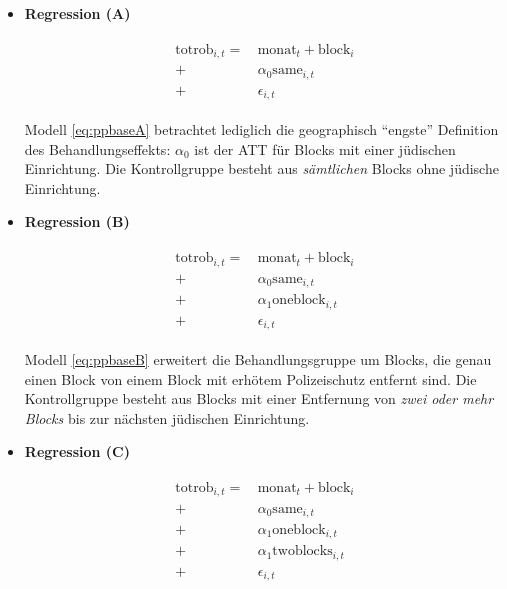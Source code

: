 \documentclass[
  a4paper,
  DIV=11,
  oneside]{scrreprt}
\begin{document}
\begin{itemize}
\item
  \textbf{Regression (A)}

  \begin{align}
      \begin{split}
        \text{totrob}_{i,t} 
          =&\, \text{monat}_t + \text{block}_i \\
         + &\, \alpha_0 \text{same}_{i,t} \\
         + &\, \epsilon_{i,t}
      \end{split}\label{eq:ppbaseA}
  \end{align}

  Modell \eqref{eq:ppbaseA} betrachtet lediglich die geographisch
  ``engste'' Definition des Behandlungseffekts: \(\alpha_0\) ist der ATT
  für Blocks mit einer jüdischen Einrichtung. Die Kontrollgruppe besteht
  aus \emph{sämtlichen} Blocks ohne jüdische Einrichtung.
\item
  \textbf{Regression (B)}

  \begin{align}
      \begin{split}
        \text{totrob}_{i,t} 
          =&\, \text{monat}_t + \text{block}_i \\
         + &\, \alpha_0 \text{same}_{i,t} \\
         + &\, \alpha_1 \text{oneblock}_{i,t} \\
         + &\, \epsilon_{i,t}
      \end{split}\label{eq:ppbaseB}
  \end{align}

  Modell \eqref{eq:ppbaseB} erweitert die Behandlungsgruppe um Blocks,
  die genau einen Block von einem Block mit erhötem Polizeischutz
  entfernt sind. Die Kontrollgruppe besteht aus Blocks mit einer
  Entfernung von \emph{zwei oder mehr Blocks} bis zur nächsten jüdischen
  Einrichtung.
\item
  \textbf{Regression (C)}

  \begin{align}
      \begin{split}
        \text{totrob}_{i,t} 
          =&\, \text{monat}_t + \text{block}_i \\
         + &\, \alpha_0 \text{same}_{i,t} \\
         + &\, \alpha_1 \text{oneblock}_{i,t} \\
         + &\, \alpha_1 \text{twoblocks}_{i,t} \\
         + &\, \epsilon_{i,t}
      \end{split}\label{eq:ppbaseC}
  \end{align}


\end{itemize}
\end{document}
